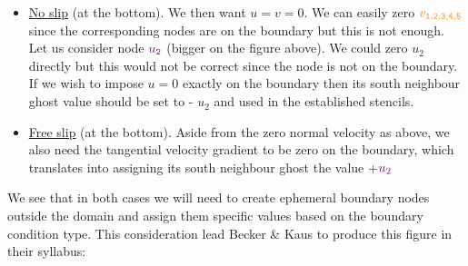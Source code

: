 \begin{itemize}
\item \underline{No slip} (at the bottom). We then want $u=v=0$. We can easily zero 
${\color{orange} v_{\tt 1,2,3,4,5}}$ since the corresponding nodes are on the boundary 
but this is not enough. Let us consider node ${\color{violet}u_{\tt 2}}$ (bigger on the figure above). 
We could zero $u_2$ directly but this would not be correct since the node is not on the boundary.
If we wish to impose $u=0$ exactly on the boundary then its south neighbour ghost value should be set to
-{\color{violet} $u_2$} and used in the established stencils.

\begin{center}
\end{center}


\item \underline{Free slip} (at the bottom). Aside from the zero normal velocity 
as above, we also need the tangential velocity gradient to be zero on the boundary, 
which translates into assigning its south neighbour ghost the value +${\color{violet} u_2}$ 
\end{itemize}

We see that in both cases we will need to create ephemeral boundary nodes outside the domain and assign
them specific values based on the boundary condition type. 
This consideration lead Becker \& Kaus to produce this figure in their syllabus:

